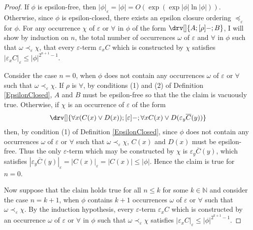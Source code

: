 \documentclass[10pt]{article}
\theoremstyle{definition}\newtheorem{remark}[theorem]{Remark}
\theoremstyle{definition}\newtheorem{example}[theorem]{Example}
\theoremstyle{definition}\newtheorem{definition}[theorem]{Definition}
\newcommand{\falsifierRule}{{\mathsf{\varepsilon}}}
\begin{document}
	\begin{proof}
		If $\phi$ is epsilon-free, then $| \phi |_\varepsilon = | \phi | = O (\exp (\exp | \phi | \ln | \phi|))$. Otherwise, since $\phi$ is epsilon-closed, there exists an epsilon closure ordering $\preccurlyeq_\varepsilon$ for $\phi$. For any occurrence $\chi$ of $\falsifierRule$ or $\forall$ in $\phi$ of the form $\drv[] {A ; [\rho]- ; B}$, I will show by induction on $n$, the total number of occurrences $\omega$ of $\falsifierRule$ and $\forall$ in $\phi$ such that $\omega \prec_\varepsilon \chi$, that every $\varepsilon$-term $\varepsilon_x C$ which is constructed by $\chi$ satisfies $| \varepsilon_x C |_\varepsilon \leq | \phi |^{2^{n + 1} - 1}$.
		
		Consider the case $n = 0$, when $\phi$ does not contain any occurrences $\omega$ of $\falsifierRule$ or $\forall$ such that $\omega \prec_\varepsilon \chi$. If $\rho$ is $\forall$, by conditions (1) and (2) of Definition \ref{EpsilonClosed}, $A$ and $B$ must be epsilon-free so that the the claim is vacuously true. Otherwise, if $\chi$ is an occurrence of $\falsifierRule$ of the form
		\[
		\drv[] {\forall x (C(x) \lor D(x)) ; [\falsifierRule]- ; \forall x C(x) \lor D(\varepsilon_y \overline{C}(y))}
		\]
		then, by condition (1) of Definition \ref{EpsilonClosed}, since $\phi$ does not contain any occurrences $\omega$ of $\falsifierRule$ or $\forall$ such that $\omega \prec_\varepsilon \chi$, $C(x)$ and $D(x)$ must be epsilon-free. Thus the only $\varepsilon$-term which may be constructed by $\chi$ is $\varepsilon_y \overline{C}(y)$, which satisfies $| \varepsilon_y \overline{C}(y) |_\varepsilon = | C(x) |_\varepsilon = | C(x) | \leq | \phi |$. Hence the claim is true for $n = 0$.
		
		Now suppose that the claim holds true for all $n \leq k$ for some $k \in \mathbb{N}$ and consider the case $n = k + 1$, when $\phi$ contains $k + 1$ occurrences $\omega$ of $\falsifierRule$ or $\forall$ such that $\omega \prec_\varepsilon \chi$. By the induction hypothesis, every $\varepsilon$-term $\varepsilon_x C$ which is constructed by an occurrence $\omega$ of $\falsifierRule$ or $\forall$ in $\phi$ such that $\omega \prec_\varepsilon \chi$ satisfies $| \varepsilon_x C |_\varepsilon \leq | \phi |^{2^{k + 1} - 1}$.
		

\end{proof}
\end{document}
